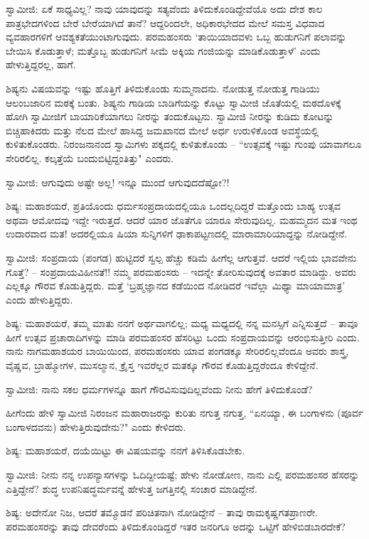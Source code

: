ಸ್ವಾಮೀಜಿ: ಏಕೆ ಸಾಧ್ಯವಿಲ್ಲ? ನಾವು ಯಾವುದನ್ನು ಸತ್ಯವೆಂದು ತಿಳಿದುಕೊಂಡಿದ್ದೇವೆಯೊ ಅದು ದೇಶ ಕಾಲ ಪಾತ್ರಭೇದಗಳಿಂದ ಬೇರೆ ಬೇರೆಯಾಗಿದೆ ತಾನೆ? ಆದ್ದರಿಂದಲೇ, ಅಧಿಕಾರಭೇದದ ಮೇಲೆ ಸಮಸ್ತ ವಿಧವಾದ ವ್ಯವಹಾರಗಳಿಗೆ ಆವಶ್ಯಕತೆಯುಂಟಾಗುವುದು. ಪರಮಹಂಸರು ‘ತಾಯಿಯಾದವಳು ಒಬ್ಬ ಹುಡುಗನಿಗೆ ಪಲಾವನ್ನು ಬೇಯಿಸಿ ಕೊಡುತ್ತಾಳೆ; ಮತ್ತೊಬ್ಬ ಹುಡುಗನಿಗೆ ಸೀಮೆ ಅಕ್ಕಿಯ ಗಂಜಿಯನ್ನು ಮಾಡಿಕೊಡುತ್ತಾಳೆ’ ಎಂದು ಹೇಳುತ್ತಿದ್ದರಲ್ಲ, ಹಾಗೆ.

ಶಿಷ್ಯನು ವಿಷಯವನ್ನು ಇಷ್ಟು ಹೊತ್ತಿಗೆ ತಿಳಿದುಕೊಂಡು ಸುಮ್ಮನಾದನು. ನೋಡುತ್ತ ನೋಡುತ್ತ ಗಾಡಿಯು ಆಲಂಬಜಾರಿನ ಮಠಕ್ಕೆ ಬಂತು. ಶಿಷ್ಯನು ಗಾಡಿಯ ಬಾಡಿಗೆಯನ್ನು ಕೊಟ್ಟು ಸ್ವಾಮೀಜಿ ಜೊತೆಯಲ್ಲಿ ಮಠದೊಳಕ್ಕೆ ಹೋಗಿ ಸ್ವಾಮೀಜಿಗೆ ಬಾಯಾರಿಕೆಯಾಗಲು ನೀರನ್ನು ತಂದುಕೊಟ್ಟನು. ಸ್ವಾಮೀಜಿ ನೀರನ್ನು ಕುಡಿದು ಕೋಟನ್ನು ಬಿಚ್ಚಿಹಾಕಿದರು ಮತ್ತು ನೆಲದ ಮೇಲೆ ಹಾಸಿದ್ದ ಜಮಖಾನದ ಮೇಲೆ ಅರ್ಧ ಉರುಳಿಕೊಂಡ ಅವಸ್ಥೆಯಲ್ಲಿ ಕುಳಿತುಕೊಂಡರು. ನಿರಂಜನಾನಂದ ಸ್ವಾಮಿಗಳು ಪಕ್ಕದಲ್ಲಿ ಕುಳಿತುಕೊಂಡು – “ಉತ್ಸವಕ್ಕೆ ಇಷ್ಟು ಗುಂಪು ಯಾವಾಗಲೂ ಸೇರಿರಲಿಲ್ಲ. ಕಲ್ಕತ್ತೆಯೆ ಬಂದುಬಿಟ್ಟಿದ್ದಂತಿತ್ತು" ಎಂದರು.

ಸ್ವಾಮೀಜಿ: ಆಗುವುದು ಅಷ್ಟೇ ಅಲ್ಲ! ಇನ್ನೂ ಮುಂದೆ ಆಗುವುದದೆಷ್ಟೋ?!

ಶಿಷ್ಯ: ಮಹಾಶಯರೆ, ಪ್ರತಿಯೊಂದು ಧರ್ಮಸಂಪ್ರದಾಯದಲ್ಲಿಯೂ ಒಂದಲ್ಲದಿದ್ದರೆ ಮತ್ತೊಂದು ಬಾಹ್ಯ ಉತ್ಸವ ಅಥವಾ ಆಮೋದವು ಇದ್ದೇ ಇರುತ್ತದೆ. ಆದರೆ ಯಾರ ಜೊತೆಗೂ ಯಾರೂ ಸೇರುವುದಿಲ್ಲ. ಮಹಮ್ಮದನ ಮತ ಇಂಥ ಉದಾರವಾದ ಮತ! ಅದರಲ್ಲಿಯೂ ಷಿಯಾ ಸುನ್ನಿಗಳಿಗೆ ಢಾಕಾಪಟ್ಟಣದಲ್ಲಿ ಮಾರಾಮಾರಿಯಾದ್ದನ್ನು ನೋಡಿದ್ದೇನೆ.

ಸ್ವಾಮೀಜಿ: ಸಂಪ್ರದಾಯ (ಪಂಗಡ) ಹುಟ್ಟಿದರೆ ಸ್ವಲ್ಪ ಹೆಚ್ಚು ಕಡಿಮೆ ಹೀಗೆಲ್ಲ ಆಗುತ್ತವೆ. ಆದರೆ ಇಲ್ಲಿಯ ಭಾವವೇನು ಗೊತ್ತೆ? – ಸಂಪ್ರದಾಯವಿಹೀನತೆ!! ನಮ್ಮ ಪರಮಹಂಸರು – ಇದನ್ನೇ ತೋರಿಸುವುದಕ್ಕೆ ಅವತಾರ ಮಾಡಿದ್ದು. ಅವರು ಎಲ್ಲಕ್ಕೂ ಗೌರವ ಕೊಡುತ್ತಿದ್ದರು. ಮತ್ತೆ ‘ಬ್ರಹ್ಮಜ್ಞಾನದ ಕಡೆಯಿಂದ ನೋಡಿದರೆ ಇವೆಲ್ಲಾ ಮಿಥ್ಯಾ ಮಾಯಾಮಾತ್ರ’ ಎಂದು ಹೇಳುತ್ತಿದ್ದರು.

ಶಿಷ್ಯ: ಮಹಾಶಯರೆ, ತಮ್ಮ ಮಾತು ನನಗೆ ಅರ್ಥವಾಗಲಿಲ್ಲ; ಮಧ್ಯ ಮಧ್ಯದಲ್ಲಿ ನನ್ನ ಮನಸ್ಸಿಗೆ ಎನ್ನಿಸುತ್ತದೆ – ತಾವೂ ಹೀಗೆ ಉತ್ಸವ ಪ್ರಚಾರಾದಿಗಳನ್ನು ಮಾಡಿ ಪರಮಹಂಸರ ಹೆಸರಿಟ್ಟು ಒಂದು ಸಂಪ್ರದಾಯವನ್ನು ಆರಂಭಿಸುತ್ತೀರಿ ಎಂದು. ನಾನು ನಾಗಮಹಾಶಯರ ಬಾಯಿಯಿಂದ, ಪರಮಹಂಸರು ಯಾವ ಪಂಗಡಕ್ಕೂ ಸೇರಿರಲಿಲ್ಲವೆಂದೂ ಅವರು ಶಾಸ್ತ್ರ, ವೈಷ್ಣವ, ಬ್ರಾಹ್ಮೋಗಳ, ಮುಸಲ್ಮಾನ, ಕ್ರೈಸ್ತ ಇವರೆಲ್ಲರ ಮತಕ್ಕೂ ಗೌರವ ಕೊಡುತ್ತಿದ್ದರೆಂದೂ ಕೇಳಿದ್ದೇನೆ.

ಸ್ವಾಮೀಜಿ: ನಾನು ಸಕಲ ಧರ್ಮಗಳನ್ನೂ ಹಾಗೆ ಗೌರವಿಸುವುದಿಲ್ಲವೆಂದು ನೀನು ಹೇಗೆ ತಿಳಿದುಕೊಂಡೆ?

ಹೀಗೆಂದು ಹೇಳಿ ಸ್ವಾಮೀಜಿ ನಿರಂಜನ ಮಹಾರಾಜರನ್ನು ಕುರಿತು ನಗುತ್ತ ನಗುತ್ತ, “ಏನಯ್ಯಾ, ಈ ಬಂಗಾಳನು (ಪೂರ್ವ ಬಂಗಾಳದವನು) ಹೇಳುತ್ತಿರುವುದೇನು?" ಎಂದು ಕೇಳಿದರು.

ಶಿಷ್ಯ: ಮಹಾಶಯರೆ, ದಯೆಯಿಟ್ಟು ಈ ವಿಷಯವನ್ನು ನನಗೆ ತಿಳಿಸಿಕೊಡಬೇಕು.

ಸ್ವಾಮೀಜಿ: ನೀನು ನನ್ನ ಉಪನ್ಯಾಸಗಳನ್ನು ಓದಿದ್ದೀಯಷ್ಟೆ; ಹೇಳು ನೋಡೋಣ, ನಾನು ಎಲ್ಲಿ ಪರಮಹಂಸರ ಹೆಸರನ್ನು ಎತ್ತಿದ್ದೇನೆ? ಶುದ್ಧ ಉಪನಿಷದ್ಧರ್ಮವನ್ನೆ ಹೇಳುತ್ತ ಜಗತ್ತಿನಲ್ಲಿ ಸಂಚಾರ ಮಾಡಿದ್ದೇನೆ.

ಶಿಷ್ಯ: ಅದೇನೋ ನಿಜ, ಆದರೆ ತಮ್ಮೊಡನೆ ಪರಿಚಿತನಾಗಿ ನೋಡಿದ್ದೇನೆ – ತಾವು ರಾಮಕೃಷ್ಣಗತಪ್ರಾಣರೇ. ಪರಮಹಂಸರನ್ನು ತಾವು ದೇವರೆಂದು ತಿಳಿದುಕೊಂಡಿದ್ದರೆ ಇತರ ಜನರಿಗೂ ಅದನ್ನು ಒಟ್ಟಿಗೆ ಹೇಳಿಬಿಡಬಾರದೇಕೆ?

